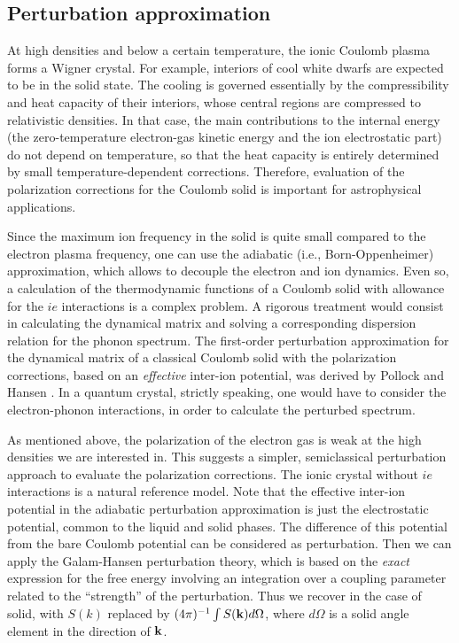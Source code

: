 \subsection{Perturbation approximation}
\label{sec-pert}
%
At high densities and below a certain temperature,
the ionic Coulomb plasma forms a Wigner crystal.
For example, interiors of cool white dwarfs \cite{WD}
are expected to be in the solid state.
The cooling 
is governed essentially by the compressibility
and heat capacity of their interiors,
whose central regions are compressed to 
relativistic densities.
In that case, the main contributions to the internal energy
(the zero-temperature electron-gas kinetic energy
and the ion electrostatic part) do 
not depend on temperature, so that
the heat capacity is entirely determined by small
temperature-dependent corrections.
Therefore, evaluation of the polarization corrections
for the Coulomb solid is important for astrophysical applications.

Since the maximum ion frequency in the solid is quite small compared to
the electron plasma frequency, one can use the adiabatic
(i.e., Born-Oppenheimer) approximation,
which allows to decouple the electron and ion dynamics.
Even so, a calculation of the  thermodynamic functions of a
Coulomb solid with allowance for the $ie$ interactions
is a complex problem. A rigorous treatment would consist in 
calculating the dynamical matrix
and solving a corresponding dispersion 
relation for the phonon spectrum.
The first-order
perturbation approximation for the dynamical matrix 
of a classical Coulomb solid with the polarization corrections,
based on an {\em effective\/} inter-ion potential,
was derived by Pollock and Hansen 
\cite{PollockHansen}.
In a quantum crystal, strictly speaking, one would have to
consider the electron-phonon interactions, in order to calculate
the perturbed spectrum.

As mentioned above, the polarization of the electron gas is weak
at the high densities we are interested in.
This suggests a simpler, semiclassical perturbation
approach to evaluate the polarization corrections.
The ionic crystal without $ie$ interactions
is a natural reference model.
Note that the effective inter-ion potential 
in the adiabatic perturbation approximation \cite{PollockHansen}
is just the electrostatic potential, common to the liquid and solid
phases. The difference of this potential from
the bare Coulomb potential can be considered as perturbation.
Then we can apply the Galam-Hansen \cite{GalamHansen}
perturbation theory, which is based on the {\em exact\/}
expression for the free energy involving an integration
over a coupling parameter related to the ``strength'' 
of the perturbation. 
Thus we recover  in the case of solid,
with $S(k)$ replaced by 
$(4\pi)^{-1} \int S({\bf k}) d\Omega$,
where $d\Omega$ is a solid angle element in the direction of 
${\bf k}$.

